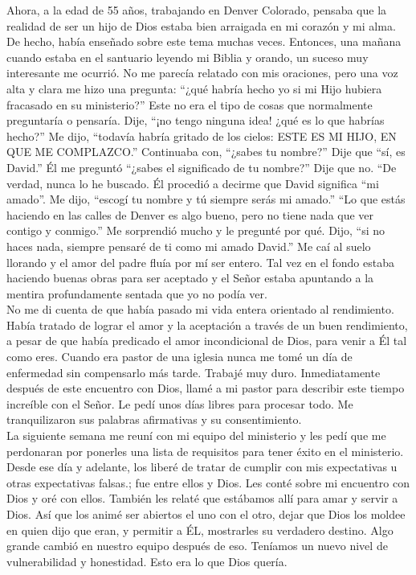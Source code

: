 \documentclass[twoside, 12pt]{book}
\begin{document}
Ahora, a la edad de 55 años, trabajando en Denver Colorado, pensaba que la realidad de ser un hijo de Dios estaba bien arraigada en mi corazón y mi alma. De hecho, había enseñado sobre este tema muchas veces. Entonces, una mañana cuando estaba en el santuario leyendo mi Biblia y orando, un suceso muy interesante me ocurrió. No me parecía relatado con mis oraciones, pero una voz alta y clara me hizo una pregunta: “¿qué habría hecho yo si mi Hijo hubiera fracasado en su ministerio?”  Este no era el tipo de cosas que normalmente preguntaría o pensaría. Dije, “¡no tengo ninguna idea! ¿qué es lo que habrías hecho?” Me dijo, “todavía habría gritado de los cielos: ESTE ES MI HIJO, EN QUE ME COMPLAZCO.” Continuaba con, “¿sabes tu nombre?” Dije que “sí, es David.” Él me preguntó “¿sabes el significado de tu nombre?” Dije que no. “De verdad, nunca lo he buscado. Él procedió a decirme que David significa “mi amado”.  Me dijo, “escogí tu nombre y tú siempre serás mi amado.” “Lo que estás haciendo en las calles de Denver es algo bueno, pero no tiene nada que ver contigo y conmigo.” Me sorprendió mucho y le pregunté por qué. Dijo, “si no haces nada, siempre pensaré de ti como mi amado David.” Me caí al suelo llorando y el amor del padre fluía por mí ser entero. Tal vez en el fondo estaba haciendo buenas obras para ser aceptado y el Señor estaba apuntando a la mentira profundamente sentada que yo no podía ver.\\

No me di cuenta de que había pasado mi vida entera orientado al rendimiento.  Había tratado de lograr el amor y la aceptación a través de un buen rendimiento, a pesar de que había predicado el amor incondicional de Dios, para venir a Él tal como eres. Cuando era pastor de una iglesia nunca me tomé un día de enfermedad sin compensarlo más tarde.  Trabajé muy duro.  Inmediatamente después de este encuentro con Dios, llamé a mi pastor para describir este tiempo increíble con el Señor.  Le pedí unos días libres para procesar todo.  Me tranquilizaron sus palabras afirmativas y su consentimiento.\\

La siguiente semana me reuní con mi equipo del ministerio y les pedí que me perdonaran por ponerles una lista de requisitos para tener éxito en el ministerio. Desde ese día y adelante, los liberé de tratar de cumplir con mis expectativas u otras expectativas falsas.; fue entre ellos y Dios.  Les conté sobre mi encuentro con Dios y oré con ellos.  También les relaté que estábamos allí para amar y servir a Dios.  Así que los animé ser abiertos el uno con el otro, dejar que Dios los moldee en quien dijo que eran, y permitir a ÉL, mostrarles su verdadero destino.  Algo grande cambió en nuestro equipo después de eso. Teníamos un nuevo nivel de vulnerabilidad y honestidad.  Esto era lo que Dios quería.\\
\end{document}
